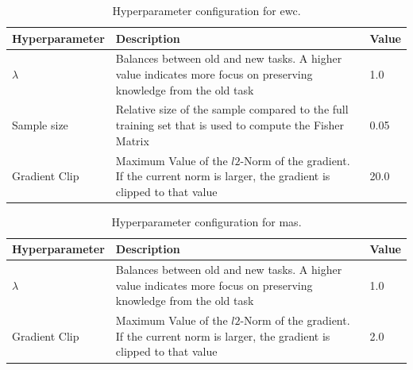\begin{table}[h!]
    \begin{tabularx}{\textwidth}{|l | X | l |} 
        \hline
        Hyperparameter & Description & Value \\ 
        \hline 
        $\lambda$ & Balances between old and new tasks. A higher value \newline indicates more focus 
        on preserving knowledge from \newline the old task & 1.0  \\ 
        Sample size & Relative size of the sample compared to the \newline full training set that is used to 
        compute \newline the Fisher Matrix & 0.05  \\ 
        Gradient Clip & Maximum Value of the $l2$-Norm of the gradient. \newline If the current norm is larger, the \newline
        gradient is clipped to that value & 20.0 \\ 
        \hline
    \end{tabularx}
    \caption{Hyperparameter configuration for \gls{ewc}.}
    \label{fig:EWCparams}
\end{table}

\begin{table}[h!]
    \begin{tabularx}{\textwidth}{| l | X | l |} 
        \hline
        Hyperparameter & Description & Value \\ 
        \hline 
        $\lambda$ & Balances between old and new tasks. A higher value indicates \newline more focus
        on preserving knowledge \newline from the old task & 1.0  \\ 
        Gradient Clip & Maximum Value of the $l2$-Norm of the gradient. If \newline the current norm is larger, the
        gradient \newline is clipped to that value & 2.0 \\ 
        \hline
    \end{tabularx}
    \caption{Hyperparameter configuration for \gls{mas}.}
    \label{fig:MASparams}
\end{table}

